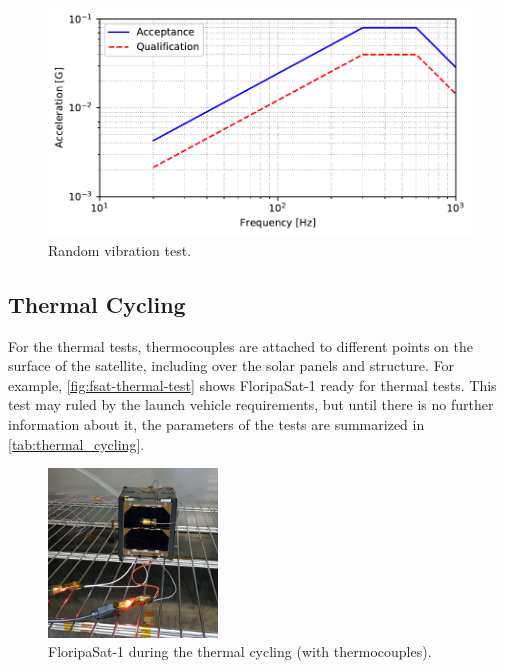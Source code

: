 \begin{figure}[!htb]
    \begin{center}
        \includegraphics[width=\textwidth]{curves/random_vibration.pdf}
        \caption{Random vibration test.}
        \label{fig:vibration-random}
    \end{center}
\end{figure}

\subsection{Thermal Cycling}

For the thermal tests, thermocouples are attached to different points on the surface of the satellite, including over the solar panels and structure. For example, \autoref{fig:fsat-thermal-test} shows FloripaSat-1 ready for thermal tests. This test may ruled by the launch vehicle requirements, but until there is no further information about it, the parameters of the tests are summarized in \autoref{tab:thermal_cycling}.

\begin{figure}[!htb]
    \begin{center}
        \includegraphics[width=0.4\textwidth]{figures/fsat_fm_thermal_cycling.jpg}
        \caption{FloripaSat-1 during the thermal cycling (with thermocouples).}
        \label{fig:fsat-thermal-test}
    \end{center}
\end{figure}

